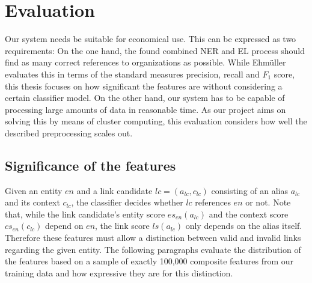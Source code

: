 \section{Evaluation}
\label{sec:evaluation}
Our system needs be suitable for economical use. This can be expressed as two requirements: On the one hand, the found combined NER and EL process should find as many correct references to organizations as possible. While Ehmüller~\cite{ehmueller} evaluates this in terms of the standard measures precision, recall and $F_1$ score, this thesis focuses on how significant the features are without considering a certain classifier model. On the other hand, our system has to be capable of processing large amounts of data in reasonable time. As our project aims on solving this by means of cluster computing, this evaluation considers how well the described preprocessing scales out.



\subsection{Significance of the features}
Given an entity $en$ and a link candidate $lc=(a_{lc}, c_{lc})$ consisting of an alias $a_{lc}$ and its context $c_{lc}$, the classifier decides whether $lc$ references $en$ or not. Note that, while the link candidate's entity score $es_{en}(a_{lc})$ and the context score $cs_{en}(c_{lc})$ depend on $en$, the link score $ls(a_{lc})$ only depends on the alias itself. Therefore these features must allow a distinction between valid and invalid links regarding the given entity. The following paragraphs evaluate the distribution of the features based on a sample of exactly 100,000 composite features from our training data and how expressive they are for this distinction.

